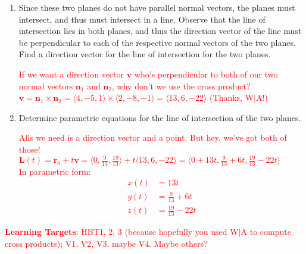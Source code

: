 \documentclass[10pt]{article}
\newcommand{\vv}{\mathbf{v}}
\newcommand{\vn}{\mathbf{n}}
\newcommand{\red}[1]{ %
	\textcolor{red}{#1} }%
\begin{document}
\begin{enumerate}[leftmargin=0pt]
\begin{enumerate}
		\red{
			Let's solve both scalar equations for $z$, and then equate the two $z$'s. 
			\begin{align*}
				\textrm{Plane 1: } 4x - 5y + z &= -2 \\
				z &= -2 -4x + 5y \\
				\textrm{Plane 2: } 2x - 8y - z &= -7 \\
				z &= 2x - 8y + 7 \\
				-2 - 4x + 5y &= 2x - 8y + 7 \\
				6x -13y &= -9
				\intertext{Now we get to pick some value we want for one of these variables. How about $x=0$?}
				-13y &= -9 \\
				y &= \tfrac{9}{13}
				\intertext{Cool, so now we have the $x$- and $y$-coordinates of a point that's on both planes. Substituting back into one of our $z$ equations:}
				z &= -2 -4x +5y \\
				&= -2 -4(0) + 5(\tfrac{9}{13}) = \tfrac{19}{13}
			\end{align*}
			Therefore, $(0, \tfrac{9}{13}, \tfrac{19}{13})$ is a point that lies on both planes.
		}
		\item Since these two planes do not have parallel normal vectors, the planes must intersect, and thus must intersect in a line. Observe that the line of intersection lies in both planes, and thus the direction vector of the line must be perpendicular to each of the respective normal vectors of the two planes. Find a direction vector for the line of intersection for the two planes.
		
		\red{
			If we want a direction vector $\vv$ who's perpendicular to both of our two normal vectors $\vn_1$ and $\vn_2$, why don't we use the cross product? \\
			$\vv = \vn_1 \times \vn_2 = \langle 4, -5, 1\rangle \times \langle 2, -8, -1 \rangle = \langle 13, 6, -22 \rangle$ (Thanks, W$|$A!)
		}
		\item Determine parametric equations for the line of intersection of the two planes.
		
		\red{
			Alls we need is a direction vector and a point. But hey, we've got both of those! \\
			$\mathbf{L}(t) = \mathbf{r}_0 + t \vv 
			= \langle 0, \tfrac{9}{13}, \tfrac{19}{13} \rangle 
			+ t \langle 13, 6, -22 \rangle
			= \langle 0 + 13t, \tfrac{9}{13} + 6t, \tfrac{19}{13} - 22t \rangle$ \\
			In parametric form:
			\begin{align*}
				x(t) &= 13t\\
				y(t) &= \tfrac{9}{13} + 6t\\
				z(t) &= \tfrac{19}{13} - 22t
			\end{align*}
		}
	\end{enumerate}
	
	\end{enumerate}
	
	\red{\textbf{Learning Targets}: HBT1, 2, 3 (because hopefully you used W$|$A to compute cross products); V1, V2, V3, maybe V4. Maybe others?}
	
\end{document}
